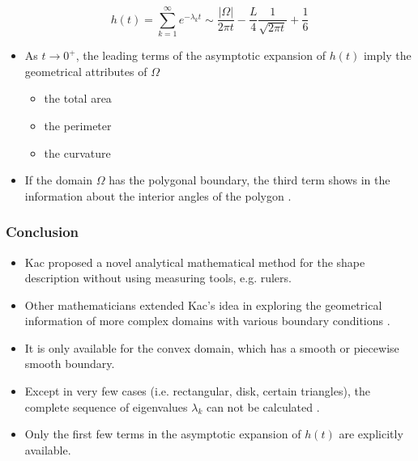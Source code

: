        \begin{equation}\label{eq:kac_result}
          h(t) = \sum_{k=1}^{\infty} e^{-\lambda_kt} \sim \frac{|\Omega|}{2\pi t} - \frac{L}{4} \frac{1}{\sqrt{2\pi t}} + \frac{1}{6}
       \end{equation}
     
      \begin{itemize} 
        \item As $t \rightarrow 0^{+}$, the leading terms of the asymptotic expansion of $h(t)$ imply the geometrical attributes of $\Omega$
          \begin{itemize}
            \item the total area
            \item the perimeter
            \item the curvature
          \end{itemize}
          
        \item If the domain $\Omega$ has the polygonal boundary, the third term shows in the information about the interior angles of the polygon \cite{grieser2013hearing}.
      \end{itemize}



    \subsubsection{Conclusion}


        \begin{itemize}
          \item Kac proposed a novel analytical mathematical method for the shape description without using measuring tools, e.g. rulers.
          \item Other mathematicians extended Kac's idea in exploring the geometrical information of more complex domains with various boundary conditions \cite{khabou2007shape}\cite{gottlieb1985eigenvalues}\cite{gottlieb1983hearing} \cite{zayed1989heat}\cite{sleeman1984trace}.
        \end{itemize}
        
        
        \begin{itemize}
          \item It is only available for the convex domain, which has a smooth or piecewise smooth boundary.  
          \item Except in very few cases (i.e. rectangular, disk, certain triangles), the complete sequence of eigenvalues $\lambda_k$ can not be calculated \cite{grieser2013hearing}.
          \item Only the first few terms in the asymptotic expansion of $h(t)$ are explicitly available.
        \end{itemize}


